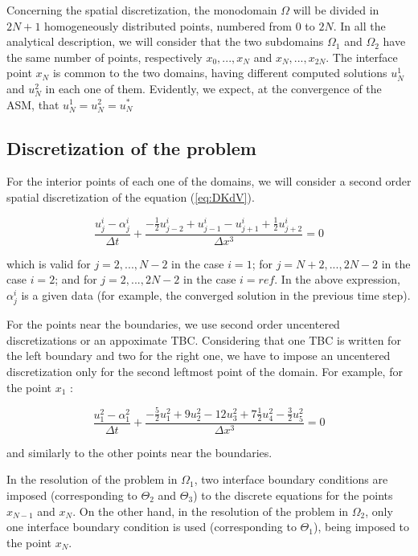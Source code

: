 \indent Concerning the spatial discretization, the monodomain $\Omega$ will be divided in $2N + 1$ homogeneously distributed points, numbered from $0$ to $2N$. In all the analytical description, we will consider that the two subdomains $\Omega_1$ and $\Omega_2$ have the same number of points, respectively $x_0,...,x_N$ and $x_N,...,x_{2N}$. The interface point $x_N$ is common to the two domains, having different computed solutions $u_N^1$ and $u_N^2$ in each one of them. Evidently, we expect, at the convergence of the ASM, that $u_N^1 = u_N^2 = u_N^*$

\subsection{Discretization of the problem}

\indent For the interior points of each one of the domains, we will consider a second order spatial discretization of the equation (\ref{eq:DKdV}).

\begin{equation}
    \label{eq:FDdiscretization}
    \frac{u_j^i - \alpha_j^i}{\Delta t} + \frac{-\frac{1}{2}u_{j-2}^i + u_{j-1}^i - u_{j+1}^i + \frac{1}{2}u_{j+2}^i }{\Delta x ^3} = 0
\end{equation}

\noindent which is valid for $j=2,...,N-2$ in the case $i=1$; for $j=N+2,...,2N-2$ in the case $i=2$; and for $j=2,...,2N-2$ in the case $i=ref$. In the above expression, $\alpha_j^i$ is a given data (for example, the converged solution in the previous time step).

\indent For the points near the boundaries, we use second order uncentered discretizations or an appoximate TBC. Considering that one TBC is written for the left boundary and two for the right one, we have to impose an uncentered discretization only for the second leftmost point of the domain. For example, for the point $x_1$ : 

\begin{equation}
    \label{eq:uncenteredFDdiscretization0}
    \frac{u_{1}^2 - \alpha_{1}^2}{\Delta t} + \frac{-\frac{5}{2}u_{1}^2 + 9u_{2}^2 - 12 u_{3}^2 + 7\frac{1}{2}u_{4}^2 -\frac{3}{2}u_{5}^2}{\Delta x ^3} = 0
\end{equation}

\noindent and similarly to the other points near the boundaries.

\indent In the resolution of the problem in $\Omega_1$, two interface boundary conditions are imposed (corresponding to $\Theta_2$ and $\Theta_3$) to the discrete equations for the points $x_{N-1}$ and $x_N$. On the other hand, in the resolution of the problem in $\Omega_2$, only one interface boundary condition is used (corresponding to $\Theta_1$), being imposed to the point $x_N$.


